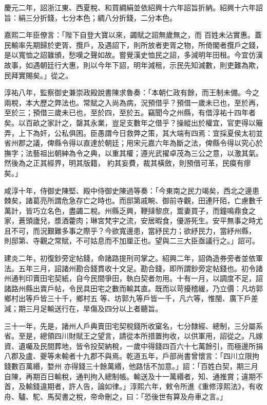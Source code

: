 \begin{pinyinscope}
 慶元二年，詔浙江東、西夏稅、和買綢絹並依紹興十六年詔旨折納。紹興十六年詔旨：絹三分折錢，七分本色；綢八分折錢，二分本色。



 嘉熙二年臣僚言：「陛下自登大寶以來，蠲賦之詔無歲無之，而
 百姓未沾實惠。蓋民輸率先期歸於吏胥、攬戶，及遇詔下，則所放者吏胥之物，所倚閣者攬戶之錢，是以寬恤之詔雖頒，愁嘆之聲如故。嘗覺漢史恤民之詔，多減明年田租。今宜仿漢故事，如遇朝廷行大惠，則以今年下詔，明年減租，示民先知減數，則吏難為欺，民拜實賜矣。」從之。



 淳祐八年，監察御史兼崇政殿說書陳求魯奏：「本朝仁政有餘，而王制未備。今之兩稅，本大歷之弊法也。常賦之入尚為病，況預借乎？預借一歲未已也，至於再，
 至於三；預借三歲未已也，至於四，至於五。竊聞今之州縣，有借淳祐十四年者矣。以百畝之家計之，罄其永業，豈足支數年之借乎？操縱出於權宜，官吏得以簸弄，上下為奸，公私俱困。臣愚謂今日救弊之策，其大端有四焉：宜採夏侯太初並省州郡之議，俾縣令得以直達於朝廷；用宋元嘉六年為斷之法，俾縣令得以究心於撫字；法藝祖出朝紳為令之典，以重其權；遵光武擢卓茂為三公之意，以激其氣。然後為之正其經界，明其版籍，
 約其妄費，裁其橫斂，則預借可革，民瘼有瘳矣。」



 咸淳十年，侍御史陳堅、殿中侍御史陳過等奏：「今東南之民力竭矣，西北之邊患棘矣，諸葛亮所謂危急存亡之時也。而邸第戚畹、御前寺觀，田連阡陌，亡慮數千萬計，皆巧立名色，盡蠲二稅。州縣乏興，鞭撻黎庶，鬻妻買子，而鐘鳴鼎食之家，蒼頭廬兒，漿酒藿肉；琳宮梵宇之流，安居暇食，優游死生。安平無事之時尤且不可，而況艱難多事之際乎？今欲寬邊患，當紓民力；欲紓民力，當紓州縣，
 則邸第、寺觀之常賦，不可姑息而不加厘正也。望與二三大臣亟議行之。」詔可。



 建炎二年，初復鈔旁定帖錢，命諸路提刑司掌之。紹興二年，詔偽造券旁者並依軍法。五年三月，詔諸州勘合錢貫收十文足。勘合錢，即所謂鈔旁定帖錢也。初令諸州通判印賣田宅契紙，自今民間爭田，執白契者勿用。十有一月，以調度不足，詔諸路州縣出賣戶帖，令民具田宅之數而輸其直。既而以苛擾稽緩，乃立價：凡坊郭鄉村出等戶皆三十千，鄉村五
 等、坊郭九等戶皆一千，凡六等，惟閩、廣下戶差減；期三月足輸送行在，旱傷及四分以上者聽旨。



 三十一年，先是，諸州人戶典賣田宅契稅錢所收窠名，七分隸經、總制，三分屬系省。至是，總領四川財賦王之望言，請從本所措置拘收，以供軍用，詔從之。凡嫁資、遺囑及民間葬地，皆令投契納稅，一歲中得錢四百六十七萬餘引，而極邊所捐八郡及盧、夔等未輸者十九郡不與焉。乾道五年，戶部尚書曾懷言：「四川立限拘錢數百萬緡，婺州
 亦得錢三十餘萬緡，他路恬不加意。」詔：「百姓白契，期三月自陳，再期百日輸稅，通判拘入總制帳。輸送及十一萬緡者，知、通推賞；違期不首，及輸錢違期者，許人告，論如律。」淳熙六年，敕令所進《重修淳熙法》，有收舟、驢、駝、馬契書之稅，帝命刪之，曰：「恐後世有算及舟車之言。」




\end{pinyinscope}

